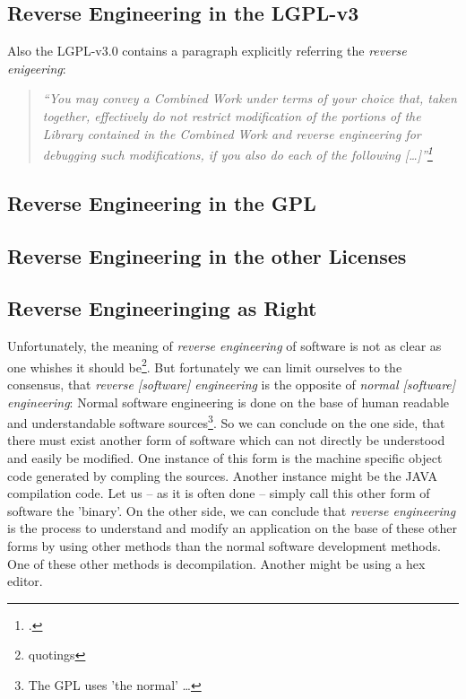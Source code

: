 \subsection{Reverse Engineering in the LGPL-v3}
Also the LGPL-v3.0 contains a paragraph explicitly referring the \emph{reverse
enigeering}:


\begin{quote}\emph{
\enquote{You may convey a Combined Work under terms of your choice that,
taken together, effectively \emph{do not restrict} modification of the portions
of the Library contained in the Combined Work and \emph{reverse engineering} for
debugging such modifications, if you also do each of the following
[\ldots]}\footcite[cf.][\nopage wp]{Lgpl30OsiLicense2007a}}
\end{quote}


\subsection{Reverse Engineering in the GPL}

\subsection{Reverse Engineering in the other Licenses}

\subsection{Reverse Engineeringing as Right}

Unfortunately, the meaning of \emph{reverse engineering} of software is not as
clear as one whishes it should be\footnote{quotings}. But fortunately we can
limit ourselves to the consensus, that \emph{reverse [software] engineering} is
the opposite of \emph{normal [software] engineering}: Normal software
engineering is done on the base of human readable and understandable software
sources\footnote{The GPL uses 'the normal' \ldots}. So we can conclude on the
one side, that there must exist another form of software which can not directly be
understood and easily be modified. One instance of this form is the machine
specific object code generated by compling the sources. Another instance might
be the JAVA compilation code. Let us -- as it is often done -- simply call this
other form of software the 'binary'. On the other side, we can conclude that
\emph{reverse engineering} is the process to understand and modify an application on the base of these other forms by using other methods than the normal software development
methods. One of these other methods is decompilation. Another might be using a
hex editor.

